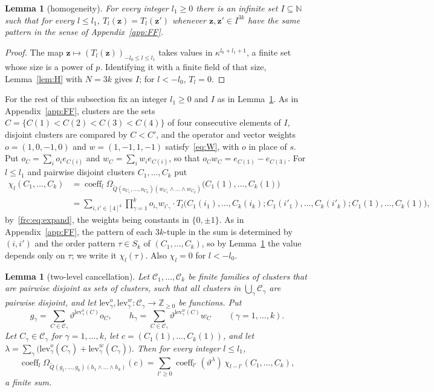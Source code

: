 \documentclass[11pt]{amsart}
\newtheorem{lemma}[theorem]{Lemma}
\theoremstyle{definition}
\theoremstyle{remark}
\numberwithin{equation}{section}
\newcommand{\N}{\mathbb N}
\newcommand{\Z}{\mathbb Z}
\newcommand{\cC}{\mathcal{C}}
\newcommand{\coeff}{\operatorname{coeff}}
\theoremstyle{plain}
\theoremstyle{definition}
\theoremstyle{plain}
\begin{document}
\begin{lemma}[homogeneity]\label{frc:lem:homogeneity}
For every integer $l_1\ge0$ there is an infinite set $I\subseteq\N$ such that for every $l\le l_1$,
$T_l(\mathbf z)=T_l(\mathbf z')$ whenever $\mathbf z,\mathbf z'\in I^{3k}$ have the same pattern in the sense of Appendix~\ref{app:FF}.
\end{lemma}

\begin{proof}
The map $\mathbf z\mapsto(T_l(\mathbf z))_{-l_0\le l\le l_1}$ takes values in $\kappa^{l_0+l_1+1}$, a finite set whose
size is a power of $p$. Identifying it with a finite field of that size, Lemma~\ref{lem:H} with $N=3k$ gives $I$; for
$l<-l_0$, $T_l=0$.
\end{proof}

For the rest of this subsection fix an integer $l_1\ge0$ and $I$ as in Lemma~\ref{frc:lem:homogeneity}. As in
Appendix~\ref{app:FF}, clusters are the sets $C=\{C(1)<C(2)<C(3)<C(4)\}$ of four consecutive elements of $I$, disjoint
clusters are compared by $C<C'$, and the operator and vector weights $o=(1,0,-1,0)$ and $w=(1,-1,1,-1)$
satisfy~\eqref{eq:W}, with $o$ in place of $s$. Put $o_C=\sum_io_ie_{C(i)}$ and $w_C=\sum_iw_ie_{C(i)}$, so that
$o_Cw_C=e_{C(1)}-e_{C(3)}$. For $l\le l_1$ and pairwise disjoint clusters $C_1,\dots,C_k$ put
\begin{align*}
 \chi_l(C_1,\dots,C_k)&=\coeff_l\Omega_{\widetilde Q(o_{C_1},\dots,o_{C_k})(w_{C_1}\wedge\dots\wedge w_{C_k})}
 \bigl(C_1(1),\dots,C_k(1)\bigr)\\
 &=\sum_{i,i'\in[4]^k}\prod_{\gamma=1}^ko_{i_\gamma}w_{i'_\gamma}\cdot
 T_l\bigl(C_1(i_1),\dots,C_k(i_k);C_1(i'_1),\dots,C_k(i'_k);C_1(1),\dots,C_k(1)\bigr),
\end{align*}
by~\eqref{frc:eq:expand}, the weights being constants in $\{0,\pm1\}$. As in Appendix~\ref{app:FF}, the pattern of each
$3k$\nobreakdash-tuple in the sum is determined by $(i,i')$ and the order pattern $\tau\in S_k$ of $(C_1,\dots,C_k)$, so
by Lemma~\ref{frc:lem:homogeneity} the value depends only on $\tau$; we write it $\chi_l(\tau)$. Also $\chi_l=0$ for
$l<-l_0$.

\begin{lemma}[two-level cancellation]\label{frc:lem:clusters}
Let $\cC_1,\dots,\cC_k$ be finite families of clusters that are pairwise disjoint as sets of clusters, such that all
clusters in $\bigcup_\gamma\cC_\gamma$ are pairwise disjoint, and let $\mathrm{lev}^o_\gamma,\mathrm{lev}^w_\gamma\colon
\cC_\gamma\to\Z_{\ge0}$ be functions. Put
\[
 g_\gamma=\sum_{C\in\cC_\gamma}\vartheta^{\mathrm{lev}^o_\gamma(C)}o_C,\qquad
 h_\gamma=\sum_{C\in\cC_\gamma}\vartheta^{\mathrm{lev}^w_\gamma(C)}w_C\qquad(\gamma=1,\dots,k).
\]
Let $C_\gamma\in\cC_\gamma$ for $\gamma=1,\dots,k$, let $c=(C_1(1),\dots,C_k(1))$, and let
$\lambda=\sum_\gamma\bigl(\mathrm{lev}^o_\gamma(C_\gamma)+\mathrm{lev}^w_\gamma(C_\gamma)\bigr)$. Then for every integer
$l\le l_1$,
\[
 \coeff_l\Omega_{\widetilde Q(g_1,\dots,g_k)(h_1\wedge\dots\wedge h_k)}(c)
 =\sum_{l'\ge0}\coeff_{l'}(\vartheta^\lambda)\,\chi_{l-l'}(C_1,\dots,C_k),
\]
a finite sum.
\end{lemma}
\end{document}
